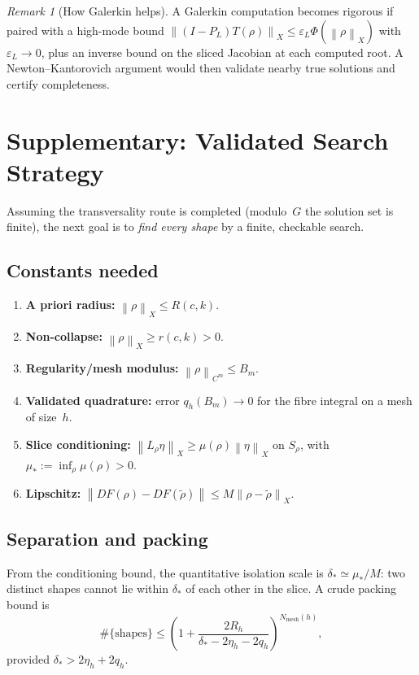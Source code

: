 \documentclass[12pt]{article}
\theoremstyle{definition}
\theoremstyle{remark}
\newtheorem{remark}[theorem]{Remark}
\newcommand{\norm}[1]{\left\|#1\right\|}
\begin{document}
\begin{remark}[How Galerkin helps]
  A Galerkin computation becomes rigorous if paired with a high-mode bound
  $\norm{(I-P_L)T(\rho)}_X\leq\varepsilon_L\Phi(\norm\rho_X)$ with
  $\varepsilon_L\to 0$, plus an inverse bound on the sliced Jacobian at each
  computed root.  A Newton--Kantorovich argument would then validate nearby
  true solutions and certify completeness.
\end{remark}

\section{Supplementary: Validated Search Strategy}
\label{sec:validated-search}

Assuming the transversality route is completed (modulo~$G$ the solution set
is finite), the next goal is to \emph{find every shape} by a finite,
checkable search.

\subsection{Constants needed}

\begin{enumerate}[leftmargin=2em]
  \item \textbf{A priori radius:} $\norm\rho_X\leq R(c,k)$.
  \item \textbf{Non-collapse:} $\norm\rho_X\geq r(c,k)>0$.
  \item \textbf{Regularity/mesh modulus:} $\norm\rho_{C^m}\leq B_m$.
  \item \textbf{Validated quadrature:} error $q_h(B_m)\to 0$ for the
    fibre integral on a mesh of size~$h$.
  \item \textbf{Slice conditioning:}
    $\norm{L_\rho\eta}_X\geq\mu(\rho)\norm\eta_X$ on $S_\rho$, with
    $\mu_*:=\inf_\rho\mu(\rho)>0$.
  \item \textbf{Lipschitz:}
    $\norm{DF(\rho)-DF(\tilde\rho)}\leq M\norm{\rho-\tilde\rho}_X$.
\end{enumerate}

\subsection{Separation and packing}

From the conditioning bound, the quantitative isolation scale is
$\delta_*\simeq\mu_*/M$: two distinct shapes cannot lie within
$\delta_*$ of each other in the slice.  A crude packing bound is
\[
  \#\{\text{shapes}\}
  \leq
  \left(1+\frac{2R_h}{\delta_*-2\eta_h-2q_h}\right)^{N_{\mathrm{mesh}}(h)},
\]
provided $\delta_*>2\eta_h+2q_h$.
\end{document}
